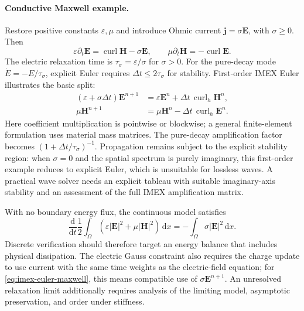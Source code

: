 \documentclass[11pt,openany]{book}
\numberwithin{equation}{chapter}
\theoremstyle{definition}
\theoremstyle{remark}
\newcommand{\dd}{\mathrm d}
\newcommand{\curl}{\operatorname{curl}}
\begin{document}
\paragraph{Conductive Maxwell example.}
Restore positive constants $\varepsilon,\mu$ and introduce Ohmic current $\bm j=\sigma\bm E$, with $\sigma\geq0$.
Then
\begin{equation}\label{eq:conductive-maxwell}
\varepsilon\partial_t\bm E=\curl\bm H-\sigma\bm E,\qquad
\mu\partial_t\bm H=-\curl\bm E.
\end{equation}
The electric relaxation time is $\tau_\sigma=\varepsilon/\sigma$ for $\sigma>0$.
For the pure-decay mode $\dot E=-E/\tau_\sigma$, explicit Euler requires $\Delta t\leq2\tau_\sigma$ for stability.
First-order IMEX Euler illustrates the basic split:
\begin{equation}\label{eq:imex-euler-maxwell}
\begin{aligned}
(\varepsilon+\sigma\Delta t)\bm E^{n+1}
 &=\varepsilon\bm E^n+\Delta t\,\curl_h\bm H^n,\\
\mu\bm H^{n+1}&=\mu\bm H^n-\Delta t\,\curl_h\bm E^n.
\end{aligned}
\end{equation}
Here coefficient multiplication is pointwise or blockwise; a general finite-element formulation uses material mass matrices.
The pure-decay amplification factor becomes $(1+\Delta t/\tau_\sigma)^{-1}$.
Propagation remains subject to the explicit stability region: when $\sigma=0$ and the spatial spectrum is purely imaginary,
this first-order example reduces to explicit Euler, which is unsuitable for lossless waves.
A practical wave solver needs an explicit tableau with suitable imaginary-axis stability and an assessment of the full IMEX amplification matrix.

With no boundary energy flux, the continuous model satisfies
\begin{equation}\label{eq:conductive-energy}
\frac{\dd}{\dd t}\frac12\int_\Omega
(\varepsilon|\bm E|^2+\mu|\bm H|^2)\,\dd x
=-\int_\Omega\sigma|\bm E|^2\,\dd x.
\end{equation}
Discrete verification should therefore target an energy balance that includes physical dissipation.
The electric Gauss constraint also requires the charge update to use current with the same time weights as the electric-field equation;
for \eqref{eq:imex-euler-maxwell}, this means compatible use of $\sigma\bm E^{n+1}$.
An unresolved relaxation limit additionally requires analysis of the limiting model, asymptotic preservation, and order under stiffness.
\end{document}
